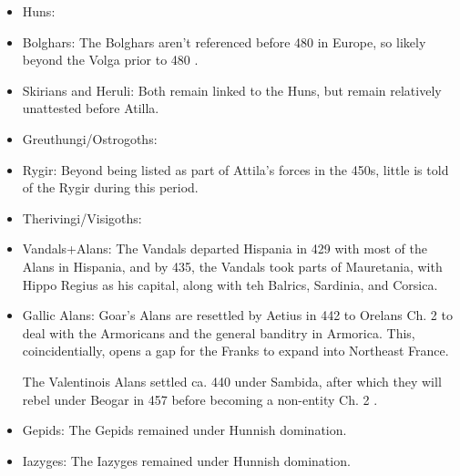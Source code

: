 \documentclass{article}
\newcommand{\specificCite}[1]{\tiny #1 \normalsize}
\begin{document}
	\begin{itemize}
		\item Huns:\newline
		
		\item Bolghars:\newline
		The Bolghars aren't referenced before 480 in Europe, so likely beyond the Volga prior to 480 \cite{KimHuns}.
		
		\item Skirians and Heruli:\newline
		Both remain linked to the Huns, but remain relatively unattested before Atilla.
		
		\item Greuthungi/Ostrogoths:\newline
		
		\item Rygir:\newline
		Beyond being listed as part of Attila's forces in the 450s, little is told of the Rygir during this period.
		
		\item Therivingi/Visigoths:\newline
		
		\item Vandals+Alans:\newline
		The Vandals departed Hispania in 429 with most of the Alans in Hispania, and by 435, the Vandals took parts of Mauretania, with Hippo Regius as his capital, along with teh Balrics, Sardinia, and Corsica. 
		
		\item Gallic Alans:\newline
		Goar's Alans are resettled by Aetius in 442 to Orelans \cite{BachrachAlans}\specificCite{Ch. 2} to deal with the Armoricans and the general banditry in Armorica.
		This, coincidentially, opens a gap for the Franks to expand into Northeast France.
		
		The Valentinois Alans settled ca. 440 under Sambida, after which they will rebel under Beogar in 457 before becoming a non-entity \cite{BachrachAlans}\specificCite{Ch. 2}.
		
		\item Gepids:\newline
		The Gepids remained under Hunnish domination.
		
		\item Iazyges:\newline
		The Iazyges remained under Hunnish domination.
		

\end{itemize}
\end{document}
